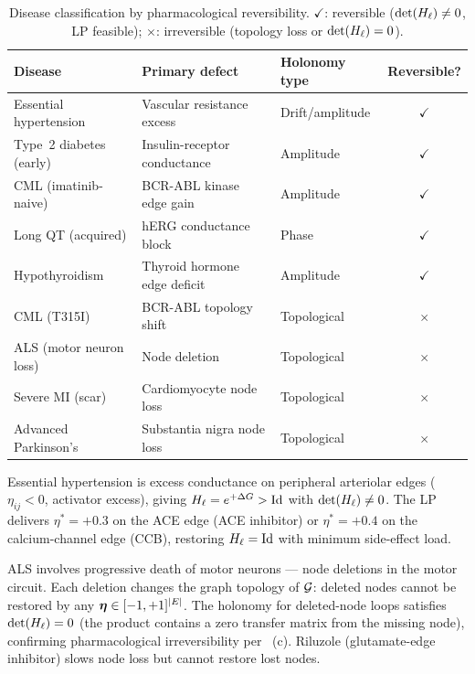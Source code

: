 \begin{table}[!htbp]
\centering
\caption{Disease classification by pharmacological reversibility.
$\checkmark$: reversible ($\det(H_\ell)\neq 0$, LP feasible);
$\times$: irreversible (topology loss or $\det(H_\ell)=0$).}
\label{tab:ch09-reversibility}
\begin{tabular}{@{}lllc@{}}
\toprule
Disease & Primary defect & Holonomy type & Reversible? \\
\midrule
Essential hypertension     & Vascular resistance excess   & Drift/amplitude & $\checkmark$ \\
Type~2 diabetes (early)    & Insulin-receptor conductance & Amplitude       & $\checkmark$ \\
CML (imatinib-naive)       & BCR-ABL kinase edge gain     & Amplitude       & $\checkmark$ \\
Long QT (acquired)         & hERG conductance block       & Phase           & $\checkmark$ \\
Hypothyroidism             & Thyroid hormone edge deficit & Amplitude       & $\checkmark$ \\
CML (T315I)                & BCR-ABL topology shift       & Topological     & $\times$     \\
ALS (motor neuron loss)    & Node deletion                & Topological     & $\times$     \\
Severe MI (scar)           & Cardiomyocyte node loss      & Topological     & $\times$     \\
Advanced Parkinson's       & Substantia nigra node loss   & Topological     & $\times$     \\
\bottomrule
\end{tabular}
\end{table}

\begin{example}
\label{ex:ch09-hypertension}
Essential hypertension is excess conductance on peripheral arteriolar
edges ($\eta_{ij} < 0$, activator excess), giving $H_\ell = e^{+\Delta G} > \mathrm{Id}$
with $\det(H_\ell) \neq 0$.  The LP delivers $\eta^* = +0.3$ on the ACE edge
(ACE inhibitor) or $\eta^* = +0.4$ on the calcium-channel edge (CCB),
restoring $H_\ell = \mathrm{Id}$ with minimum side-effect load.
\end{example}

\begin{example}
\label{ex:ch09-als}
ALS involves progressive death of motor neurons — node deletions in the motor
circuit.  Each deletion changes the graph topology of $\mathcal{G}$: deleted nodes
cannot be restored by any $\boldsymbol{\eta} \in [-1,+1]^{|E|}$.  The holonomy for
deleted-node loops satisfies $\det(H_\ell) = 0$ (the product contains a zero
transfer matrix from the missing node), confirming pharmacological
irreversibility per ~(c).  Riluzole (glutamate-edge
inhibitor) slows node loss but cannot restore lost nodes.
\end{example}

